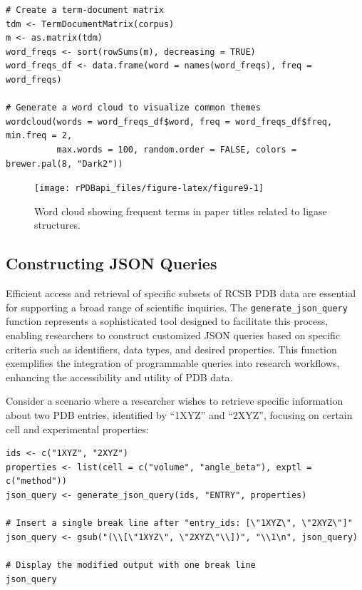 \begin{verbatim}
# Create a term-document matrix
tdm <- TermDocumentMatrix(corpus)
m <- as.matrix(tdm)
word_freqs <- sort(rowSums(m), decreasing = TRUE)
word_freqs_df <- data.frame(word = names(word_freqs), freq = word_freqs)

# Generate a word cloud to visualize common themes
wordcloud(words = word_freqs_df$word, freq = word_freqs_df$freq, min.freq = 2,
          max.words = 100, random.order = FALSE, colors = brewer.pal(8, "Dark2"))
\end{verbatim}

\begin{figure}[H]
\texttt{[image: rPDBapi\_files/figure-latex/figure9-1]} \caption{Word cloud showing frequent terms in paper titles related to ligase structures.}\label{fig:figure9}
\end{figure}

\subsection{Constructing JSON Queries}\label{constructing-json-queries}

Efficient access and retrieval of specific subsets of RCSB PDB data are essential for supporting a broad range of scientific inquiries. The \texttt{generate\_json\_query} function represents a sophisticated tool designed to facilitate this process, enabling researchers to construct customized JSON queries based on specific criteria such as identifiers, data types, and desired properties. This function exemplifies the integration of programmable queries into research workflows, enhancing the accessibility and utility of PDB data.

Consider a scenario where a researcher wishes to retrieve specific information about two PDB entries, identified by ``1XYZ'' and ``2XYZ'', focusing on certain cell and experimental properties:

\begin{verbatim}
ids <- c("1XYZ", "2XYZ")
properties <- list(cell = c("volume", "angle_beta"), exptl = c("method"))
json_query <- generate_json_query(ids, "ENTRY", properties)

# Insert a single break line after "entry_ids: [\"1XYZ\", \"2XYZ\"]"
json_query <- gsub("(\\[\"1XYZ\", \"2XYZ\"\\])", "\\1\n", json_query)

# Display the modified output with one break line
json_query
\end{verbatim}


